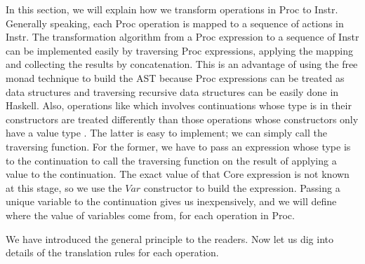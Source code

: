 In this section, we will explain how we transform operations in Proc to Instr. Generally speaking, each Proc operation is mapped to a sequence of actions in Instr. The transformation algorithm from a Proc expression to a sequence of Instr can be implemented easily by traversing Proc expressions, applying the mapping and collecting the results by concatenation. This is an advantage of using the free monad technique to build the AST because Proc expressions can be treated as data structures and traversing recursive data structures can be easily done in Haskell. Also, operations like  which involves continuations whose type is  in their constructors are treated differently than those operations whose constructors only have a value type . The latter is easy to implement; we can simply call the traversing function. For the former, we have to pass an expression whose type is  to the continuation to call the traversing function on the result of applying a value to the continuation. The exact value of that Core expression is not known at this stage, so we use the $Var$ constructor to build the expression. Passing a unique variable to the continuation gives us  inexpensively, and we will define where the value of variables come from, for each operation in Proc. 

We have introduced the general principle to the readers. Now let us dig into details of the translation rules for each operation. 

